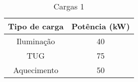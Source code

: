 \begin{table}[H]
\centering
\caption{Cargas 1}
\label{table:1}
\begin{tabular}{|c|c|}
\hline
Tipo de carga        & Potência (kW) \\ \hline
Iluminação           & 40            \\ \hline
TUG                  & 75            \\ \hline
Aquecimento          & 50            \\ \hline
\end{tabular}
\end{table}


